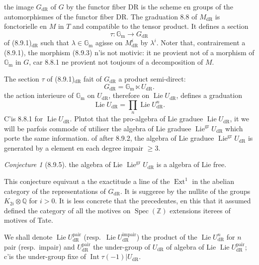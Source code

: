 \documentclass[12pt,a4paper]{article}
\theoremstyle{plain}
\theoremstyle{definition}
\theoremstyle{remark}
\newtheorem{conjecture}[theorem]{Conjecture}
\DeclareMathOperator{\Spec}{Spec}
\DeclareMathOperator{\Ext}{Ext}
\DeclareMathOperator{\Lie}{Lie}
\DeclareMathOperator{\Int}{Int}
\newcommand{\gr}{\mathrm{gr}}
\newcommand{\DR}{\mathrm{dR}}
\newcommand{\Z}{\mathbb{Z}}
\newcommand{\Q}{\mathbb{Q}}
\newcommand{\Gm}{\mathbb{G}_\mathrm{m}}
\begin{document}
the image $G_\DR$ of $G$ by the functor fiber DR is the scheme en groups of the automorphismes of the functor fiber DR. The graduation 8.8 of $M_\DR$ is fonctorielle en $M$ in $T$ and compatible to the tensor product. It defines a section
\begin{equation*}\tag{8.9.3}
\tau: \Gm \longrightarrow G_\DR
\end{equation*}
of (8.9.1)$_\DR$ such that $\lambda \in \Gm$ agisse on $M_\DR^i$ by $\lambda^i$. Noter that, contrairement a (8.9.1), the morphism (8.9.3) n'is not motivic: it ne provient not of a morphism of $\Gm$ in $G$, car 8.8.1 ne provient not toujours of a decomposition of $M$.

The section $\tau$ of (8.9.1)$_\DR$ fait of $G_\DR$ a product semi-direct:
\begin{equation*}\tag{8.9.4}
G_\DR = \Gm \ltimes U_\DR.
\end{equation*}
the action interieure of $\Gm$ on $U_\DR$, therefore on $\Lie U_\DR$, defines a graduation
\[
\Lie U_\DR = \prod_n \Lie U_\DR^n.
\]
C'is 8.8.1 for $\Lie U_\DR$. Plutot that the pro-algebra of Lie graduee $\Lie U_\DR$, it we will be parfois commode of utiliser the algebra of Lie graduee $\Lie^\gr U_\DR$ which porte the same information. of after 8.9.2, the algebra of Lie graduee $\Lie^\gr U_\DR$ is generated by a element en each degree impair $\geq 3$.

\begin{conjecture}[8.9.5]\label{conj:8.9.5}
the algebra of Lie $\Lie^\gr U_\DR$ is a algebra of Lie free.
\end{conjecture}

This conjecture equivaut a the exactitude a line of the $\Ext^1$ in the abelian category of the representations of $G_\DR$. It is suggeree by the nullite of the groups $K_{2i} \otimes \Q$ for $i > 0$. It is less concrete that the precedentes, en this that it assumed defined the category of all the motives on $\Spec(\Z)$ extensions iterees of motives of Tate.

We shall denote $\Lie U_\DR^{\mathrm{pair}}$ (resp.~$\Lie U_\DR^{\mathrm{impair}}$) the product of the $\Lie U_\DR^n$ for $n$ pair (resp.~impair) and $U_\DR^{\mathrm{pair}}$ the under-group of $U_\DR$ of algebra of Lie $\Lie U_\DR^{\mathrm{pair}}$; c'is the under-group fixe of $\Int \tau(-1)|U_\DR$.
\end{document}
